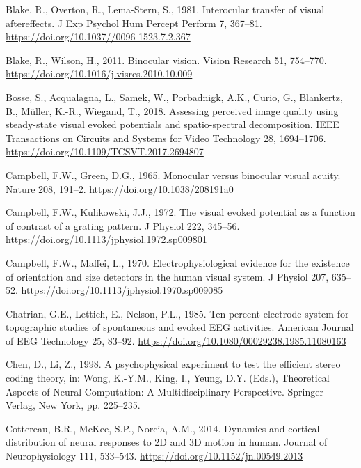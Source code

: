 \documentclass[
  12pt,
]{article}
\newlength{\cslhangindent}
\newenvironment{CSLReferences}[2] %
 {\begin{list}{}{%
  \setlength{\itemindent}{0pt}
  \setlength{\leftmargin}{0pt}
  \setlength{\parsep}{0pt}
  \ifodd #1
   \setlength{\leftmargin}{\cslhangindent}
   \setlength{\itemindent}{-1\cslhangindent}
  \fi
  \setlength{\itemsep}{#2\baselineskip}}}
 {\end{list}}
\begin{document}
\begin{CSLReferences}{1}{0}
Blake, R., Overton, R., Lema-Stern, S., 1981. Interocular transfer of
visual aftereffects. J Exp Psychol Hum Percept Perform 7, 367--81.
\url{https://doi.org/10.1037//0096-1523.7.2.367}

Blake, R., Wilson, H., 2011. Binocular vision. Vision Research 51,
754--770. \url{https://doi.org/10.1016/j.visres.2010.10.009}

Bosse, S., Acqualagna, L., Samek, W., Porbadnigk, A.K., Curio, G.,
Blankertz, B., Müller, K.-R., Wiegand, T., 2018. Assessing perceived
image quality using steady-state visual evoked potentials and
spatio-spectral decomposition. IEEE Transactions on Circuits and Systems
for Video Technology 28, 1694--1706.
\url{https://doi.org/10.1109/TCSVT.2017.2694807}

Campbell, F.W., Green, D.G., 1965. Monocular versus binocular visual
acuity. Nature 208, 191--2. \url{https://doi.org/10.1038/208191a0}

Campbell, F.W., Kulikowski, J.J., 1972. The visual evoked potential as a
function of contrast of a grating pattern. J Physiol 222, 345--56.
\url{https://doi.org/10.1113/jphysiol.1972.sp009801}

Campbell, F.W., Maffei, L., 1970. Electrophysiological evidence for the
existence of orientation and size detectors in the human visual system.
J Physiol 207, 635--52.
\url{https://doi.org/10.1113/jphysiol.1970.sp009085}

Chatrian, G.E., Lettich, E., Nelson, P.L., 1985. Ten percent electrode
system for topographic studies of spontaneous and evoked EEG activities.
American Journal of EEG Technology 25, 83--92.
\url{https://doi.org/10.1080/00029238.1985.11080163}

Chen, D., Li, Z., 1998. A psychophysical experiment to test the
efficient stereo coding theory, in: Wong, K.-Y.M., King, I., Yeung, D.Y.
(Eds.), Theoretical Aspects of Neural Computation: A Multidisciplinary
Perspective. Springer Verlag, New York, pp. 225--235.

Cottereau, B.R., McKee, S.P., Norcia, A.M., 2014. Dynamics and cortical
distribution of neural responses to 2D and 3D motion in human. Journal
of Neurophysiology 111, 533--543.
\url{https://doi.org/10.1152/jn.00549.2013}


\end{CSLReferences}
\end{document}
